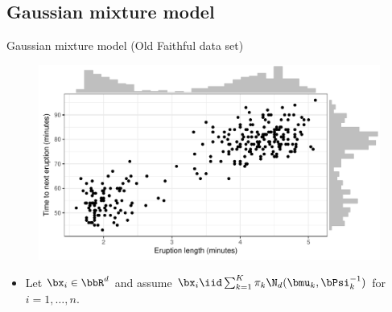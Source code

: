 \subsection{Gaussian mixture model}

\begin{frame}{Gaussian mixture model (Old Faithful data set)}
  \vspace{-15pt}
  \begin{figure}
    \centering
    \includegraphics[scale=0.65]{figure/faithful_scatter}
  \end{figure}
  \vspace{-13pt}
  \begin{itemize}
    \item Let $\bx_i \in \bbR^d$ and assume $\bx_i \iid \sum_{k=1}^K \pi_{k} \N_d(\bmu_k,\bPsi_k^{-1})$ for $i=1,\dots,n$.
  \end{itemize}
\end{frame}

